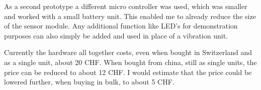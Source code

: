 As a second prototype a different micro controller was used, which was smaller and worked with a small battery unit. This enabled me to already reduce the size of the sensor module. Any additional function like LED's for demonstration purposes can also simply be added and used in place of a vibration unit.

Currently the hardware all together costs, even when bought in Switzerland and as a single unit, about 20 CHF. When bought from china, still as single units, the price can be reduced to about 12 CHF. I would estimate that the price could be lowered further, when buying in bulk, to about 5 CHF.



